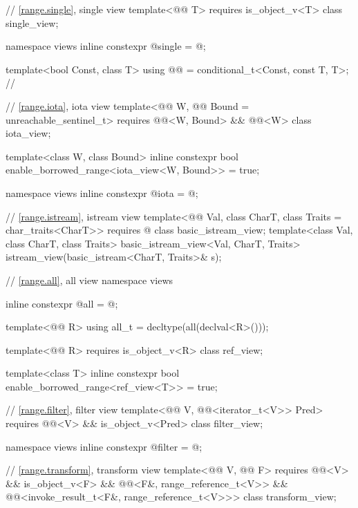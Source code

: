 \begin{codeblock}
{  // \ref{range.single}, single view
  template<@@ T>
    requires is_object_v<T>
  class single_view;

  namespace views { inline constexpr @\unspec@ single = @\unspec@; }

  template<bool Const, class T>
    using @@ = conditional_t<Const, const T, T>;   // \expos

  // \ref{range.iota}, iota view
  template<@@ W, @@ Bound = unreachable_sentinel_t>
    requires @@<W, Bound> && @@<W>
  class iota_view;

  template<class W, class Bound>
    inline constexpr bool enable_borrowed_range<iota_view<W, Bound>> = true;

  namespace views { inline constexpr @\unspec@ iota = @\unspec@; }

  // \ref{range.istream}, istream view
  template<@@ Val, class CharT, class Traits = char_traits<CharT>>
    requires @\seebelow@
  class basic_istream_view;
  template<class Val, class CharT, class Traits>
    basic_istream_view<Val, CharT, Traits> istream_view(basic_istream<CharT, Traits>& s);

  // \ref{range.all}, all view
  namespace views {
    inline constexpr @\unspec@ all = @\unspec@;

    template<@@ R>
      using all_t = decltype(all(declval<R>()));
  }

  template<@@ R>
    requires is_object_v<R>
  class ref_view;

  template<class T>
    inline constexpr bool enable_borrowed_range<ref_view<T>> = true;

  // \ref{range.filter}, filter view
  template<@@ V, @@<iterator_t<V>> Pred>
    requires @@<V> && is_object_v<Pred>
  class filter_view;

  namespace views { inline constexpr @\unspec@ filter = @\unspec@; }

  // \ref{range.transform}, transform view
  template<@@ V, @@ F>
    requires @@<V> && is_object_v<F> &&
             @@<F&, range_reference_t<V>> &&
             @@<invoke_result_t<F&, range_reference_t<V>>>
  class transform_view;

}
\end{codeblock}
